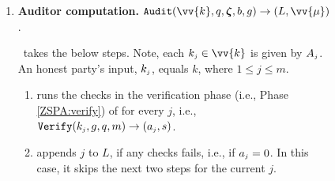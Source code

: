 \begin{figure}[ht]
\begin{center}
\begin{tcolorbox}[enhanced,width=5.5in, 
    drop fuzzy shadow southwest,
    colframe=black,colback=white]
{{\begin{enumerate}
All parties in $\{A_{\st 1},...,  A_{\st m}\}$ call the same instance of \zspa, which results in  $(k, g, q), ..., (k, g, q)$. 
%

\item\label{ZSPA-A::Auditor-computation}  {\textbf{Auditor computation.} $\mathtt{Audit}( \vv{{k}},  q, \bm\zeta, b, g)\rightarrow (L, \vv{{\mu}})$}. 

\aud\ takes the below steps. Note,  each $k_{\st j}\in \vv{{k}}$ is given by  $  A_{\scriptscriptstyle j}$. An honest party's input, $k_{\scriptscriptstyle j}$,  equals $k$, where $1\leq j \leq m$. 


\begin{enumerate}
%
\item runs the checks in the verification phase (i.e., Phase \ref{ZSPA:verify}) of \zspa for every $j$, i.e., $\mathtt{Verify}(k_{\scriptscriptstyle j}, g, q, m)\rightarrow (a_{\scriptscriptstyle j}, s)$.
\item appends $j$ to $L$, if any checks fails, i.e., if $a_{\scriptscriptstyle j}=0$. In this case, it skips the next two steps for the current $j$. 



%
%
%
%
%


\end{enumerate}
\end{enumerate}}}
\end{tcolorbox}
\end{center}
\end{figure}
